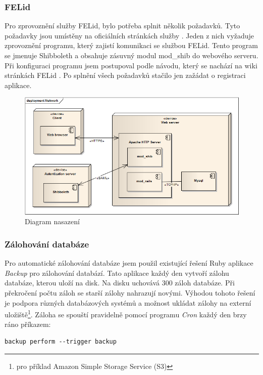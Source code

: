 \subsubsection{FELid}
Pro zprovoznění služby FELid, bylo potřeba splnit několik požadavků. Tyto požadavky jsou umístěny na oficiálních stránkách služby \cite{felid_pozadavky}. Jeden z nich vyžaduje zprovoznění programu, který zajistí komunikaci se službou FELid. Tento program se jmenuje Shibboleth a obsahuje zásuvný modul mod\_shib do webového serveru. Při konfiguraci programu jsem postupoval podle návodu, který se nachází na wiki stránkách FELid \citep{felid}. Po splnění všech požadavků stačilo jen zažádat o registraci aplikace.

\begin{figure}[h]
\begin{center}
\includegraphics[width=12cm]{figures/deployment}
\caption{Diagram nasazení}
\label{fig:deployment}
\end{center}
\end{figure}

\subsubsection{Zálohování databáze}
Pro automatické zálohování databáze jsem použil existující řešení  Ruby aplikace \textit{Backup} pro zálohování databází. Tato aplikace každý den vytvoří zálohu databáze, kterou uloží na disk. Na disku uchovává 300 záloh databáze. Při překročení počtu záloh se starší zálohy nahrazují novými. Výhodou tohoto řešení je podpora různých databázových systémů a možnost ukládat zálohy na externí uložiště\footnote{pro příklad Amazon Simple Storage Service (S3)}. Záloha se spouští pravidelně pomocí programu \textit{Cron} každý den brzy ráno příkazem:
\begin{verbatim}
backup perform --trigger backup
\end{verbatim} 

